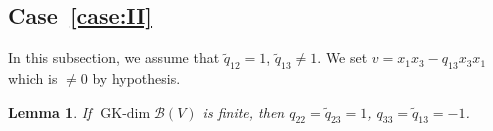\documentclass[pdftex]{sigma}
\numberwithin{equation}{section}
\newtheorem{Lemma}[Theorem]{Lemma}
\newcommand{\GK}{\operatorname{GK-dim}}
\newcommand{\toba}{\mathscr B}
\begin{document}
\subsection[Case~(II)]{Case~\ref{case:II}} In this subsection, we assume that $\widetilde{q}_{12}=1$, $\widetilde{q}_{13} \neq 1$.
We set $v = x_1x_3 - q_{13}x_3x_1$ which is $\neq 0$ by hypothesis.

\begin{Lemma}\label{lemma:caseII-general}
If $\GK \toba(V)$ is finite, then $q_{22} = \widetilde{q}_{23} = 1$, $q_{33} = \widetilde{q}_{13}=-1$.
%
%
%
\end{Lemma}
\end{document}
